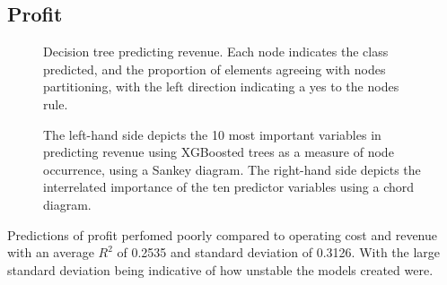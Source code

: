 \documentclass[review,12pt,authoryear]{elsarticle}
\begin{document}
\begin{linenumbers}
 \subsection{Profit}

\begin{figure} 
  \caption{Decision tree predicting revenue. Each node indicates the class predicted, and the proportion of elements agreeing with nodes partitioning, with the left direction indicating a yes to the nodes rule.}\label{fig:revenue_tree}
 \end{figure}
 
 \begin{figure}
  \caption{The left-hand side depicts the 10 most important variables in predicting revenue using XGBoosted trees as a measure of node occurrence, using a Sankey diagram. The right-hand side depicts the interrelated importance of the ten predictor variables using a chord diagram.}\label{fig:profit}
 \end{figure}

Predictions of profit perfomed poorly compared to operating cost and revenue with an average $R^2$ of 0.2535 and standard deviation of 0.3126. With the large standard deviation being indicative of how unstable the models created were.

\end{linenumbers}
 
\end{document}
